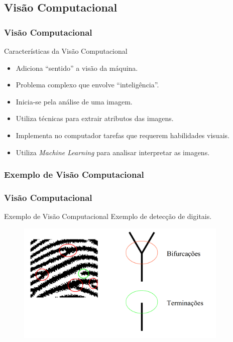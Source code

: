 \documentclass{beamer}
\begin{document}
\subsection{Visão Computacional}

\begin{frame}
\frametitle{Visão Computacional}
	\begin{block}{Características da Visão Computacional}
	
		\begin{itemize}
			\item<1-> Adiciona ``sentido'' a visão da máquina.
			\item<2-> Problema complexo que envolve ``inteligência''.
			\item<3-> Inicia-se pela análise de uma imagem. 
			\item<4-> Utiliza técnicas para extrair atributos das imagens.
			\item<5-> Implementa no computador tarefas que requerem habilidades visuais. 
			\item<6-> Utiliza \textit{Machine Learning} para analisar interpretar as imagens.
		\end{itemize}
	\end{block}
\end{frame}


\subsubsection{Exemplo de Visão Computacional}
\begin{frame}
\frametitle{Visão Computacional}
	\begin{block}{Exemplo de Visão Computacional}
		Exemplo de detecção de digitais.
	\end{block}
	\begin{figure}[!h]
		\begin{center}
			\includegraphics[width=0.9\textwidth]{Figures/bifdigitais}
		\end{center}
		
	\end{figure}
	
\end{frame}
\end{document}
